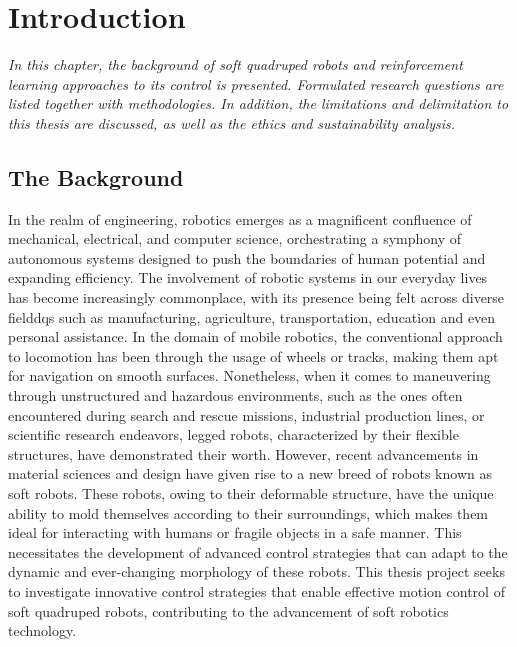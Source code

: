 \chapter{Introduction}
\label{chap1}
\textit{In this chapter, the background of soft quadruped robots and reinforcement learning approaches to its control is presented. Formulated research questions are listed together with methodologies. In addition, the limitations and delimitation to this thesis are discussed, as well as the ethics and sustainability analysis.}

\section{The Background}
In the realm of engineering, robotics emerges as a magnificent confluence of mechanical, electrical, and computer science, orchestrating a symphony of autonomous systems designed to push the boundaries of human potential and expanding efficiency\cite{billard2019Trends}. The involvement of robotic systems in our everyday lives has become increasingly commonplace, with its presence being felt across diverse fielddqs such as manufacturing\cite{wang2018Current}, agriculture\cite{li2023Development}, transportation\cite{zhang2023Finding}, education\cite{riedo2013Thymio} and even personal assistance\cite{openai2023GPT4}. In the domain of mobile robotics, the conventional approach to locomotion has been through the usage of wheels or tracks, making them apt for navigation on smooth surfaces\cite{li2011Research}. Nonetheless, when it comes to maneuvering through unstructured and hazardous environments, such as the ones often encountered during search and rescue missions\cite{hawkes2017Soft}, industrial production lines\cite{hu2021Design}, or scientific research endeavors\cite{hewing2020Learningbased}, legged robots, characterized by their flexible structures, have demonstrated their worth. However, recent advancements in material sciences and design have given rise to a new breed of robots known as soft robots. These robots, owing to their deformable structure, have the unique ability to mold themselves according to their surroundings, which makes them ideal for interacting with humans or fragile objects in a safe manner\cite{muralidharan2021Soft}. This necessitates the development of advanced control strategies that can adapt to the dynamic and ever-changing morphology of these robots\cite{wang2022Control}. This thesis project seeks to investigate innovative control strategies that enable effective motion control of soft quadruped robots, contributing to the advancement of soft robotics technology.
